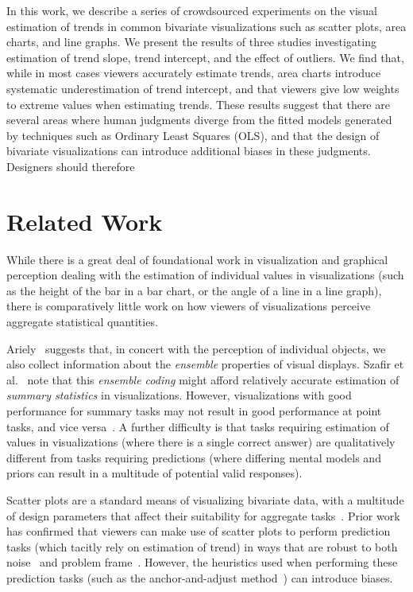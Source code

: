 \documentclass{sigchi}
\begin{document}
In this work, we describe a series of crowdsourced experiments on the visual estimation of trends in common bivariate visualizations such as scatter plots, area charts, and line graphs. We present the results of three studies investigating estimation of trend slope, trend intercept, and the effect of outliers. We find that, while in most cases viewers accurately estimate trends, area charts introduce systematic underestimation of trend intercept, and that viewers give low weights to extreme values when estimating trends. These results suggest that there are several areas where human judgments diverge from the fitted models generated by techniques such as Ordinary Least Squares (OLS), and that the design of bivariate visualizations can introduce additional biases in these judgments. Designers should therefore 

\section{Related Work}

While there is a great deal of foundational work in visualization and graphical perception dealing with the estimation of individual values in visualizations (such as the height of the bar in a bar chart, or the angle of a line in a line graph), there is comparatively little work on how viewers of visualizations perceive aggregate statistical quantities.

Ariely~\cite{ariely2001seeing} suggests that, in concert with the perception of individual objects, we also collect information about the \emph{ensemble} properties of visual displays. Szafir et al.~\cite{szafir2016four} note that this \emph{ensemble coding} might afford relatively accurate estimation of \emph{summary statistics} in visualizations. However, visualizations with good performance for summary tasks may not result in good performance at point tasks, and vice versa~\cite{albers2014task,fuchs2013evaluation}. A further difficulty is that tasks requiring estimation of values in visualizations (where there is a single correct answer) are qualitatively different from tasks requiring predictions (where differing mental models and priors can result in a multitude of potential valid responses).

Scatter plots are a standard means of visualizing bivariate data, with a multitude of design parameters that affect their suitability for aggregate tasks~\cite{cleveland1984many}. Prior work has confirmed that viewers can make use of scatter plots to perform prediction tasks (which tacitly rely on estimation of trend) in ways that are robust to both noise~\cite{harvey1997effects} and problem frame~\cite{lewandowsky2011popular}. However, the heuristics used when performing these prediction tasks (such as the anchor-and-adjust method~\cite{bolger1993context}) can introduce biases.
\end{document}
